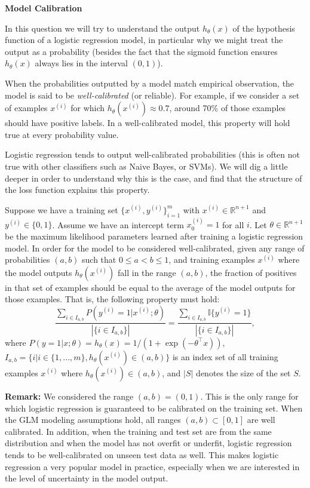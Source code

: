 \clearpage
\item {} {\bf Model Calibration}

In this question we will try to understand the output $h_\theta(x)$ of the
hypothesis function of a logistic regression model, in particular why we might
treat the output as a probability (besides the fact that the sigmoid function
ensures $h_\theta(x)$ always lies in the interval $(0, 1)$).

When the probabilities outputted by a model match empirical observation, the
model is said to be \emph{well-calibrated} (or reliable). For example, if we
consider a set of examples $x^{(i)}$ for which $h_\theta(x^{(i)})  \approx
0.7$, around 70\% of those examples should have positive labels. In a
well-calibrated model, this property will hold true at every probability value.

Logistic regression tends to output well-calibrated probabilities (this is
often not true with other classifiers such as Naive Bayes, or SVMs). We will
dig a little deeper in order to understand why this is the case, and find that
the structure of the loss function explains this property.

Suppose we have a training set $\{x^{(i)},y^{(i)}\}_{i=1}^m$ with
$x^{(i)} \in \mathbb{R}^{n+1}$ and $y^{(i)} \in \{0, 1\}$. Assume we have an
intercept term $x_0^{(i)} = 1$ for all $i$. Let $\theta \in \mathbb{R}^{n+1}$
be the maximum likelihood parameters learned after training a logistic
regression model. In order for the model to be considered well-calibrated,
given any range of probabilities $(a, b)$ such that $0 \le a < b \le 1$, and
training examples $x^{(i)}$ where the model outputs $h_\theta(x^{(i)})$ fall in
the range $(a, b)$, the fraction of positives in that set of examples should be
equal to the average of the model outputs for those examples. That is, the
following property must hold:
$$
  \frac{\sum_{i\in I_{a,b}}  P\left(y^{(i)}=1|x^{(i)};\theta\right)}
       {{|\{i\in I_{a,b}\}|}}
  = \frac{\sum_{i\in I_{a,b}} \mathbb{I}\{y^{(i)} = 1\}}
         {|\{i\in I_{a,b}\}|},
$$
where $P(y=1|x;\theta) = h_\theta(x) = 1/(1+\exp(-\theta^\top x))$, $I_{a,b} =
\{ i | i \in \{1,...,m\},  h_\theta(x^{(i)}) \in (a,b)\} $ is an index set of
all training examples $x^{(i)}$ where $h_\theta(x^{(i)}) \in (a,b)$, and $|S|$
denotes the size of the set $S$.

\begin{enumerate}
  
  
  
\end{enumerate}

\textbf{Remark:}  We considered the range $(a,b) = (0, 1)$. This is the only
range for which logistic regression is guaranteed to be calibrated on the
training set. When the GLM modeling assumptions hold, all ranges $(a,b) \subset
[0,1]$ are well calibrated. In addition, when the training and test set are
from the same distribution and when the model has not overfit or underfit,
logistic regression tends to be well-calibrated on unseen test data as well.
This makes logistic regression a very popular model in practice, especially
when we are interested in the level of uncertainty in the model output.

